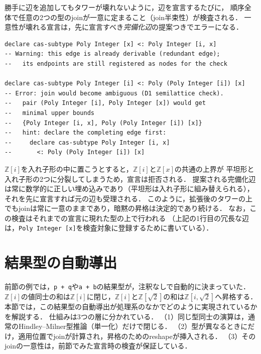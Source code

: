 勝手に辺を追加してもタワーが壊れないように，辺を宣言するたびに，
順序全体で任意の2つの型のjoinが一意に定まること（join半束性）が検査される．
一意性が壊れる宣言は，先に宣言すべき\emph{完備化辺}の提案つきでエラーになる．
\begin{lstlisting}[language=egison,numbers=none]
declare cas-subtype Poly Integer [x] <: Poly Integer [i, x]
-- Warning: this edge is already derivable (redundant edge);
--   its endpoints are still registered as nodes for the check

declare cas-subtype Poly Integer [i] <: Poly (Poly Integer [i]) [x]
-- Error: join would become ambiguous (D1 semilattice check).
--   pair (Poly Integer [i], Poly Integer [x]) would get
--   minimal upper bounds
--   {Poly Integer [i, x], Poly (Poly Integer [i]) [x]}
--   hint: declare the completing edge first:
--     declare cas-subtype Poly Integer [i, x]
--       <: Poly (Poly Integer [i]) [x]
\end{lstlisting}
$\mathbb{Z}[i]$を入れ子形の中に置こうとすると，$\mathbb{Z}[i]$と$\mathbb{Z}[x]$の共通の上界が
平坦形と入れ子形の2つに分裂してしまうため，宣言は拒否される．
提案される完備化辺は常に数学的に正しい埋め込みであり（平坦形は入れ子形に組み替えられる），
それを先に宣言すれば元の辺も受理される．
このように，拡張後のタワーの上でもjoinは常に一意のままであり，暗黙の昇格は決定的であり続ける．
なお，この検査はそれまでの宣言に現れた型の上で行われる
（上記の1行目の冗長な辺は，\lstinline{Poly Integer [x]}を検査対象に登録するために書いている）．

\section{結果型の自動導出}\label{cas-join}

前節の例では，\lstinline{p + q}や\lstinline{a + b}の結果型が，注釈なしで自動的に決まっていた．
$\mathbb{Z}[i]$の値同士の和は$\mathbb{Z}[i]$に閉じ，$\mathbb{Z}[i]$と$\mathbb{Z}[\sqrt{2}]$の和は$\mathbb{Z}[i, \sqrt{2}]$へ昇格する．
本節では，この結果型の自動導出が処理系のなかでどのように実現されているかを解説する．
仕組みは3つの層に分かれている．
（1）同じ型同士の演算は，通常のHindley--Milner型推論（単一化）だけで閉じる．
（2）型が異なるときにだけ，適用位置でjoinが計算され，昇格のためのreshapeが挿入される．
（3）そのjoinの一意性は，前節でみた宣言時の検査が保証している．

